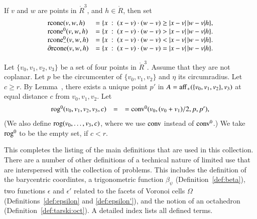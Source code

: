 \begin{definition}[rcone] 
If $v$ and $w$ are points in $\ring{R}^3$, and
  $h\in\ring{R}$, then set
  $$\begin{array}{lll}
    {\operatorname{rcone}}(v,w,h) &= \{x\ :\  (x-v)\cdot (w-v) \ge |x-v|\,|w-v| h\},\\
    {\operatorname{rcone}}^0(v,w,h) &= \{x\ :\  (x-v)\cdot (w-v) > |x-v|\,|w-v| h\}.\\
    {\operatorname{rcone}}_-^0(v,w,h) &= \{x\ :\  (x-v)\cdot (w-v) < |x-v|\,|w-v| h\}.\\
    \partial{\operatorname{rcone}}(v,w,h) &= \{x\ :\  (x-v)\cdot (w-v) = |x-v|\,|w-v| h\}.\\
    \end{array}
    $$
\end{definition}


\begin{definition} 
Let $\{v_0,v_1,v_2,v_3\}$ be a set of four points in $\ring{R}^3$.
Assume that they are not coplanar.  Let $p$ be the circumcenter
of $\{v_0,v_1,v_2\}$ and $\eta$ its circumradius.  Let $c\ge r$.
By Lemma~, there exists a unique
point $p'$ in $A={\operatorname{aff}}_+(\{v_0,v_1,v_2\},v_3)$ at equal distance $c$
from $v_0,v_1,v_2$.
Let $$
    \begin{array}{rll}
    {\operatorname{rog}}^0(v_0,v_1,v_2,v_3,c) &= 
    &= {\operatorname{conv}}^0(v_0,(v_0+v_1)/2,p,p'),\\
    \end{array}
    $$
(We also define ${\operatorname{rog}}(v_0,\ldots,v_3,c)$, where we use
${\operatorname{conv}}$ instead of ${\operatorname{conv}}^0$.)
We take ${\operatorname{rog}}^0$ to be the empty set, if $c< r$.
\end{definition}



This completes the listing of the main definitions that
are used in this collection.  There are a number of other
definitions of a technical nature of limited use that
are interspersed with the collection of problems.
This includes the definition of the barycentric coordintes,
a trigonometric function $\beta_\psi$ (Definition~\ref{def:beta}),
two functions $\epsilon$ and $\epsilon'$ related to the
facets of Voronoi cells $\Omega$ (Definitions~\ref{def:epsilon}
and \ref{def:epsilon'}), and the notion of an octahedron
(Definition~\ref{def:tarski:oct}).  A detailed index lists
all defined terms.





